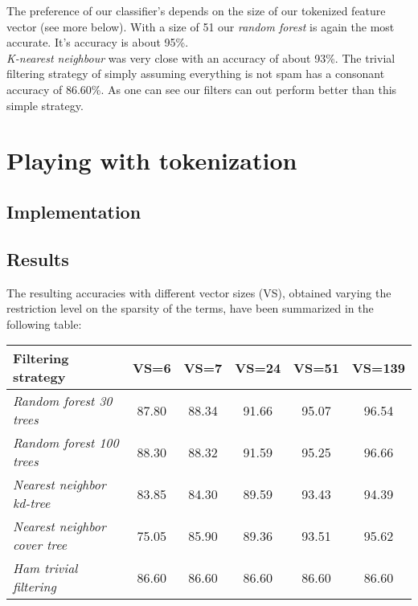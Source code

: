 \documentclass[12pt,a4paper]{article}
\begin{document}
\begin{singlespace}
The preference of our classifier's depends on the size of our tokenized feature vector (see more below). With a size of 51 our \emph{random forest} is again the most accurate. It's accuracy is about 95\%. \\

\emph{K-nearest neighbour} was very close with an accuracy of about 93\%. The trivial filtering strategy of simply assuming everything is not spam has a consonant accuracy of 86.60\%. As one can see our filters can out perform better than this simple strategy. 

\newpage
\section{Playing with tokenization}
\subsection{Implementation}

\subsection{Results}

The resulting accuracies with different vector sizes (VS), obtained varying the restriction level on the sparsity of the terms, have been summarized in the following table:

\begin{center}
    \begin{tabular}{ | l | c | c | c | c | c |}
    \hline
    \textbf{Filtering strategy}  & \textbf{VS=6} & \textbf{VS=7} & \textbf{VS=24} & \textbf{VS=51} & \textbf{VS=139}  \\ \hline \hline
    \emph{Random forest 30 trees} & 87.80 & 88.34 & 91.66 & 95.07 & 96.54   \\ \hline
    \emph{Random forest 100 trees} & 88.30 & 88.32 & 91.59 & 95.25 & 96.66   \\ \hline
    \emph{Nearest neighbor kd-tree} & 83.85 & 84.30 & 89.59 & 93.43 & 94.39  \\ \hline
    \emph{Nearest neighbor cover tree} & 75.05 & 85.90 & 89.36 & 93.51 & 95.62  \\ \hline
    \emph{Ham trivial filtering} & 86.60 & 86.60 & 86.60 & 86.60 & 86.60 \\ \hline
    \end{tabular}
\end{center}


\end{singlespace}
\end{document}
